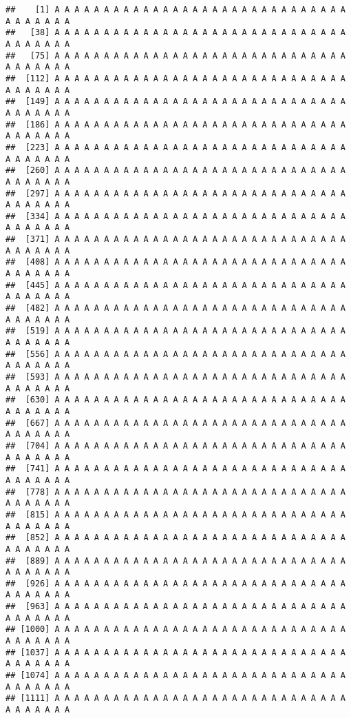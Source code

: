 \documentclass[]{article}
\begin{document}
\begin{verbatim}
##    [1] A A A A A A A A A A A A A A A A A A A A A A A A A A A A A A A A A A A A A
##   [38] A A A A A A A A A A A A A A A A A A A A A A A A A A A A A A A A A A A A A
##   [75] A A A A A A A A A A A A A A A A A A A A A A A A A A A A A A A A A A A A A
##  [112] A A A A A A A A A A A A A A A A A A A A A A A A A A A A A A A A A A A A A
##  [149] A A A A A A A A A A A A A A A A A A A A A A A A A A A A A A A A A A A A A
##  [186] A A A A A A A A A A A A A A A A A A A A A A A A A A A A A A A A A A A A A
##  [223] A A A A A A A A A A A A A A A A A A A A A A A A A A A A A A A A A A A A A
##  [260] A A A A A A A A A A A A A A A A A A A A A A A A A A A A A A A A A A A A A
##  [297] A A A A A A A A A A A A A A A A A A A A A A A A A A A A A A A A A A A A A
##  [334] A A A A A A A A A A A A A A A A A A A A A A A A A A A A A A A A A A A A A
##  [371] A A A A A A A A A A A A A A A A A A A A A A A A A A A A A A A A A A A A A
##  [408] A A A A A A A A A A A A A A A A A A A A A A A A A A A A A A A A A A A A A
##  [445] A A A A A A A A A A A A A A A A A A A A A A A A A A A A A A A A A A A A A
##  [482] A A A A A A A A A A A A A A A A A A A A A A A A A A A A A A A A A A A A A
##  [519] A A A A A A A A A A A A A A A A A A A A A A A A A A A A A A A A A A A A A
##  [556] A A A A A A A A A A A A A A A A A A A A A A A A A A A A A A A A A A A A A
##  [593] A A A A A A A A A A A A A A A A A A A A A A A A A A A A A A A A A A A A A
##  [630] A A A A A A A A A A A A A A A A A A A A A A A A A A A A A A A A A A A A A
##  [667] A A A A A A A A A A A A A A A A A A A A A A A A A A A A A A A A A A A A A
##  [704] A A A A A A A A A A A A A A A A A A A A A A A A A A A A A A A A A A A A A
##  [741] A A A A A A A A A A A A A A A A A A A A A A A A A A A A A A A A A A A A A
##  [778] A A A A A A A A A A A A A A A A A A A A A A A A A A A A A A A A A A A A A
##  [815] A A A A A A A A A A A A A A A A A A A A A A A A A A A A A A A A A A A A A
##  [852] A A A A A A A A A A A A A A A A A A A A A A A A A A A A A A A A A A A A A
##  [889] A A A A A A A A A A A A A A A A A A A A A A A A A A A A A A A A A A A A A
##  [926] A A A A A A A A A A A A A A A A A A A A A A A A A A A A A A A A A A A A A
##  [963] A A A A A A A A A A A A A A A A A A A A A A A A A A A A A A A A A A A A A
## [1000] A A A A A A A A A A A A A A A A A A A A A A A A A A A A A A A A A A A A A
## [1037] A A A A A A A A A A A A A A A A A A A A A A A A A A A A A A A A A A A A A
## [1074] A A A A A A A A A A A A A A A A A A A A A A A A A A A A A A A A A A A A A
## [1111] A A A A A A A A A A A A A A A A A A A A A A A A A A A A A A A A A A A A A

\end{verbatim}
\end{document}
